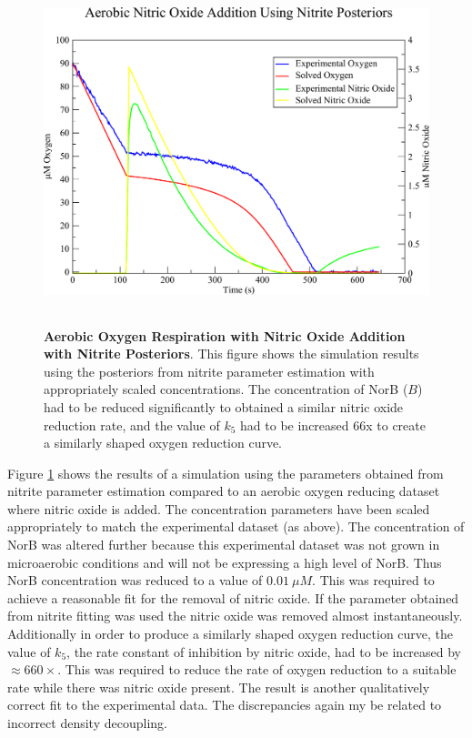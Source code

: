\begin{figure}[tbp]
 \centering
 \includegraphics[height=10cm]{./07-nitritereduction/data/no_dataset.pdf}
 \caption[Aerobic Oxygen Respiration with Nitric Oxide Addition with Nitrite Posteriors]{{\bf Aerobic Oxygen Respiration with Nitric Oxide Addition with Nitrite Posteriors}. This figure shows the simulation results using the posteriors from nitrite parameter estimation with appropriately scaled concentrations. The concentration of NorB ($B$) had to be reduced significantly to obtained a similar nitric oxide reduction rate, and the value of $k_5$ had to be increased 66x to create a similarly shaped oxygen reduction curve.
 \label{fig:nitric_oxide_simulation}}
\end{figure}

Figure \ref{fig:nitric_oxide_simulation} shows the results of a simulation using the parameters obtained from nitrite parameter estimation compared to an aerobic oxygen reducing dataset where nitric oxide is added. The concentration parameters have been scaled appropriately to match the experimental dataset (as above). The concentration of NorB was altered further because this experimental dataset was not grown in microaerobic conditions and will not be expressing a high level of NorB. Thus NorB concentration was reduced to a value of $0.01~\mu M$. This was required to achieve a reasonable fit for the removal of nitric oxide. If the parameter obtained from nitrite fitting was used the nitric oxide was removed almost instantaneously. Additionally in order to produce a similarly shaped oxygen reduction curve, the value of $k_5$, the rate constant of \cbbthree{} inhibition by nitric oxide, had to be increased by $\approx 660\times$. This was required to reduce the rate of oxygen reduction to a suitable rate while there was nitric oxide present. The result is another qualitatively correct fit to the experimental data. The discrepancies again my be related to incorrect density decoupling.

